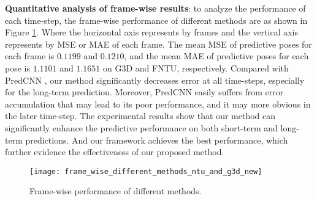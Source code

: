 \documentclass[journal]{IEEEtran}
\begin{document}
{\bf Quantitative analysis of frame-wise results}: to analyze the performance of each time-step, the frame-wise performance of different methods are as shown in Figure \ref{fig6}. Where the horizontal axis represents by frames and the vertical axis represents by MSE or MAE of each frame. The mean MSE of predictive poses for each frame is ${0.1199}$ and ${0.1210}$, and the mean MAE of predictive poses for each pose is ${1.1101}$ and ${1.1651}$ on G${3}$D and FNTU, respectively. Compared with PredCNN \cite{predcnn}, our method significantly decreases error at all time-steps, especially for the long-term prediction. Moreover, PredCNN easily suffers from error accumulation that may lead to its poor performance, and it may more obvious in the later time-step. The experimental results show that our method can significantly enhance the predictive performance on both short-term and long-term predictions. And our framework achieves the best performance, which further evidence the effectiveness of our proposed method.

\begin{figure}[!t]
\centering
\texttt{[image: frame\_wise\_different\_methods\_ntu\_and\_g3d\_new]}
\caption{Frame-wise performance of different methods.}
\label{fig6}
\end{figure}
\end{document}
